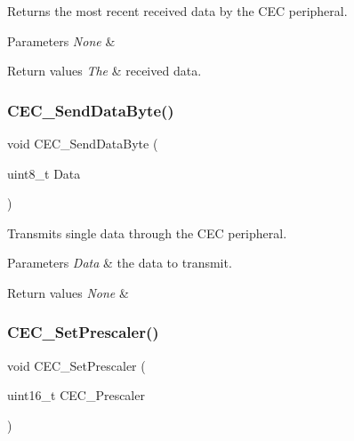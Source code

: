 Returns the most recent received data by the C\+EC peripheral. 


\begin{DoxyParams}{Parameters}
{\em None} & \\
\hline
\end{DoxyParams}

\begin{DoxyRetVals}{Return values}
{\em The} & received data. \\
\hline
\end{DoxyRetVals}
\mbox{\label{group___c_e_c___exported___functions_ga6897ab26d8f909f9160e9fac54b97441}} 
\subsubsection{\texorpdfstring{CEC\_SendDataByte()}{CEC\_SendDataByte()}}
{\footnotesize\ttfamily void C\+E\+C\+\_\+\+Send\+Data\+Byte (\begin{DoxyParamCaption}\item[{uint8\+\_\+t}]{Data }\end{DoxyParamCaption})}



Transmits single data through the C\+EC peripheral. 


\begin{DoxyParams}{Parameters}
{\em Data} & the data to transmit. \\
\hline
\end{DoxyParams}

\begin{DoxyRetVals}{Return values}
{\em None} & \\
\hline
\end{DoxyRetVals}
\mbox{\label{group___c_e_c___exported___functions_gad2fc626e28a82008a29f062975a9af11}} 
\subsubsection{\texorpdfstring{CEC\_SetPrescaler()}{CEC\_SetPrescaler()}}
{\footnotesize\ttfamily void C\+E\+C\+\_\+\+Set\+Prescaler (\begin{DoxyParamCaption}\item[{uint16\+\_\+t}]{C\+E\+C\+\_\+\+Prescaler }\end{DoxyParamCaption})}



